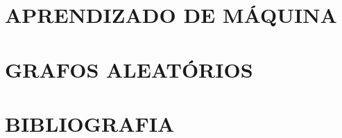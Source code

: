 


\part{APRENDIZADO DE MÁQUINA}


% 
% 



\part{GRAFOS ALEATÓRIOS}


% 
% 



\newpage
\part{BIBLIOGRAFIA}




\endgroup


